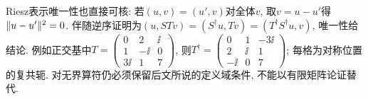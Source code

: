 Riesz表示唯一性也直接可核: 若$(u,v)=(u',v)$对全体$v$, 取$v=u-u'$得$\lVert u-u'\rVert^2=0$. 伴随逆序证明为$(u,STv)=(S^\dagger u,Tv)=(T^\dagger S^\dagger u,v)$, 唯一性给结论. 例如正交基中$T=\begin{pmatrix}0&2&\ii\\1&-\ii&0\\3\ii&1&7\end{pmatrix}$, 则$T^\dagger=\begin{pmatrix}0&1&-3\ii\\2&\ii&1\\-\ii&0&7\end{pmatrix}$; 每格为对称位置的复共轭. 对无界算符仍必须保留后文所说的定义域条件, 不能以有限矩阵论证替代.


